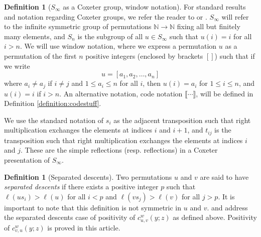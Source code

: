 \documentclass[reqno]{amsart}
\theoremstyle{definition}
\newtheorem{definition}[lemma]{Definition}
\theoremstyle{remark}
\numberwithin{equation}{subsection}
\newcommand{\cperm}[1]{\llbracket #1\rrbracket}
\begin{document}
\begin{definition}[$S_\infty$ as a Coxeter group, window notation]
	For standard results and notation regarding Coxeter groups, we refer the reader to \cite{combcox} or \cite{humphreys1992reflection}. $S_\infty$ will refer to the infinite symmetric group of permutations $\mathbb N\to\mathbb N$ fixing all but finitely many elements, and $S_n$ is the subgroup of all $u\in S_\infty$ such that $u(i)=i$ for all $i>n$. We will use window notation, where we express a permutation $u$ as a permutation of the first $n$ positive integers (enclosed by brackets $[]$) such that if we write
	$$u=[a_1,a_2,\ldots,a_n]$$
	where $a_i\neq a_j$ if $i\neq j$ and $1\leq a_i\leq n$ for all $i$, then $u(i)=a_i$ for $1\leq i\leq n$, and $u(i)=i$ if $i>n$. An alternative notation, code notation $\cperm{\cdots}$, will be defined in Definition \ref{definition:codestuff}.
	
	We use the standard notation of $s_i$ as the adjacent transposition such that right multiplication exchanges the elements at indices $i$ and $i+1$, and $t_{ij}$ is the transposition such that right multiplication exchanges the elements at indices $i$ and $j$. These are the simple reflections (resp. reflections) in a Coxeter presentation of $S_\infty$.
\end{definition}

\begin{definition}[Separated descents] \label{definition:sepdesc}
	Two permutations $u$ and $v$ are said to have \emph{separated descents} if there exists a positive integer $p$ such that $\ell(us_i) > \ell(u)$ for all $i < p$ and $\ell(vs_j) > \ell(v)$ for all $j>p$. It is important to note that this definition is not symmetric in $u$ and $v$. \cite{samuelmolev} and \cite{fan2025bumpless} address the separated descents case of positivity of $c_{u,v}^w(y;z)$ as defined above. Positivity of $c_{v,u}^w(y;z)$ is proved in this article.
\end{definition}
\end{document}
